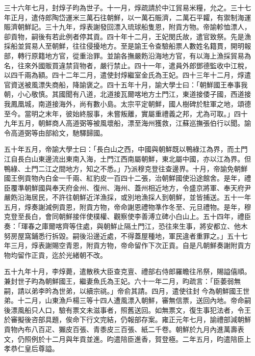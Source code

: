 \begin{pinyinscope}
三十六年七月，封焞子昀為世子。十一月，焞疏請於中江貿易米糧，允之。三十七年正月，遣侍郎陶岱運米三萬石往朝鮮，以一萬石賑濟，二萬石平糶，有禦制海運賑濟朝鮮記。三十九年，焞表謝發回漂入琉球船隻恩，附貢方物。帝諭軫恤漂人，卻貢物，嗣後有若此例者停其貢。四十年十二月，王妃閔氏故，遣官致祭。先是漁採船並貿易人至朝鮮，往往侵擾地方。至是諭王令查驗船票人數姓名籍貫，開明報部，轉行原籍地方官，從重治罪。並諭各撫嚴飭沿海地方官，有以海上漁採貿易為名，往來外國販買違禁貨物者，嚴行禁止。四十一年，遣員外郎鄧德監收中江稅，以四千兩為額。四十二年二月，遣使封焞繼室金氏為王妃。四十三年十二月，焞遣官資送被風漂失商船，降諭褒之。四十五年十月，諭大學士曰：「朝鮮國王奉事我朝，小心敬慎。其國聞有八道，北道接瓦爾喀地方土門江，東道接倭子國，西道接我鳳凰城，南道接海外，尚有數小島。太宗平定朝鮮，國人樹碑於駐軍之地，頌德至今。當明之末年，彼始終服事，未嘗叛離，實屬重禮義之邦，尤為可取。」四十九年五月，朝鮮商人高道弼等被風壞船，漂至海州獲救，江蘇巡撫張伯行以聞。諭令高道弼等由部給文，馳驛歸國。

五十年五月，帝諭大學士曰：「長白山之西，中國與朝鮮既以鴨綠江為界，而土門江自長白山東邊流出東南入海，土門江西南屬朝鮮，東北屬中國，亦以江為界。但鴨綠、土門二江之間地方，知之不悉。」乃派穆克登往查邊界。十月，帝諭免朝鮮國王例貢物內白金一千兩、紅豹皮一百四十二張，治朝鮮國使沿途館舍。是年，禮臣覆準朝鮮國與奉天府金州、復州、海州、蓋州相近地方，令盛京將軍、奉天府尹嚴飭沿海居民，不許往朝鮮近洋漁採，或別地漁採人到朝鮮，並皆捕送。五十一年五月，焞奏謝減例貢恩，附貢方物，帝命謝恩禮物準作冬至、元旦禮物。是年，穆克登至長白，會同朝鮮接伴使樸權、觀察使李善溥立碑小白山上。五十四年，禮臣奏：「琿春之庫爾喀齊等住處，與朝鮮止隔土門江，恐往來生事，將安都立、他木努房屋窩鋪悉行拆毀。嗣後沿邊近處，不得蓋屋種地，軍民違者重罪之。」五十七年三月，焞表謝賜空青恩，附貢方物，帝命留作下次正貢。自是凡朝鮮奏謝附貢方物均留作正貢，迄於光緒朝不改。

五十九年十月，李焞薨，遣散秩大臣查克亶、禮部右侍郎羅瞻往吊祭，賜謚僖順。兼封世子昀為朝鮮國王，繼妻魚氏為王妃。六十一年二月，昀疏言：「臣萎弱無嗣，請以弟李昑為世弟，以續宗祧。」帝俞其請。四月，遣使往封今為朝鮮國王世弟。十二月，山東漁戶楊三等十四人遭風漂入朝鮮，審無信票，送回內地。帝命嗣後漂風船只人口，驗有票文未滋事者，照舊送回。如無票文，復生事犯法者，令王於審擬後咨部具題，俟命下行文完結，仍報部存案。雍正元年七月，諭禮部減朝鮮貢物內布八百疋、獺皮百張、青黍皮三百張、紙二千卷。朝鮮於九月內進萬壽表文，仍照例於十二月與年貢並進。昀遣陪臣進香，賀登極。二年五月，昀遣陪臣上孝恭仁皇后尊謚。


\end{pinyinscope}
